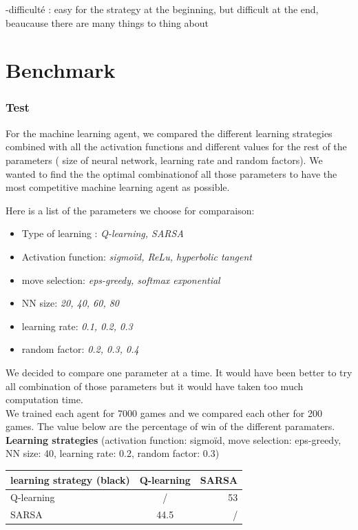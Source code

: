 \documentclass{article}
\begin{document}
-difficulté : easy for the strategy at the beginning, but difficult at the end, beaucause there are many things to thing about


\section{Benchmark} \label{sec:benchmark}

\subsubsection{Test}
For the machine learning agent, we compared the different learning strategies combined with all the activation functions and different values for the rest of the parameters ( size of neural network, learning rate and random factors). We wanted to find the the optimal combinationof all those parameters to have the most competitive machine learning agent as possible.

Here is a list of the parameters we choose for comparaison:
\begin{itemize}
    \item Type of learning : \textit{ Q-learning, SARSA}
    \item Activation function: \textit{sigmoïd, ReLu, hyperbolic tangent}
    \item move selection: \textit{eps-greedy, softmax exponential}
    \item NN size: \textit{20, 40, 60, 80}
    \item learning rate: \textit{0.1, 0.2, 0.3}
    \item random factor: \textit{0.2, 0.3, 0.4}
\end{itemize}
We decided to compare one parameter at a time. It would have been better to try all combination of those parameters but it would have taken too much computation time. \\

We trained each agent for 7000 games and we compared each other for 200 games.
The value below are the percentage of win of the different paramaters. \\

\textbf{Learning strategies}
\newline
{\footnotesize (activation function: sigmoïd, move selection: eps-greedy, NN size: 40, learning rate: 0.2, random factor: 0.3)}
\newline
\begin{tabular}{|l|c|r|}
  \hline
  learning strategy (black) & Q-learning & SARSA \\
  \hline
  Q-learning & / & 53 \\
  SARSA & 44.5 & / \\
  \hline
\end{tabular}
\newline
\end{document}
